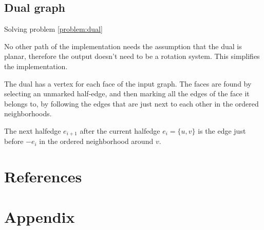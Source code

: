 \documentclass{article}
\begin{document}

	\subsection{Dual graph}\label{impl:dual}

		Solving problem \ref{problem:dual}

		No other path of the implementation needs the assumption that the dual is planar, therefore the output doesn't need to be a rotation system. This simplifies the implementation.

		The dual has a vertex for each face of the input graph. The faces are found by selecting an unmarked half-edge, and then marking all the edges of the face it belongs to, by following the edges that are just next to each other in the ordered neighborhoods.

		The next halfedge $e_{i+1}$ after the current halfedge $e_i = \{u, v\}$ is the edge just before $-e_i$ in the ordered neighborhood around $v$.



\newpage
\section{References}
	\printbibliography

\newpage
\section{Appendix}
\end{document}
